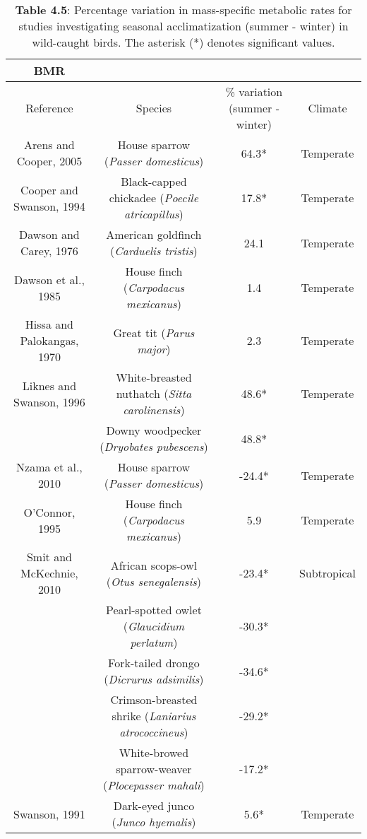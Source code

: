 \documentclass[10pt, twoside]{book} %
\begin{document}
\begin{table}[!ht]
    \centering
\caption*{\textbf{Table 4.5}: Percentage variation in mass-specific metabolic rates for studies investigating seasonal acclimatization (summer - winter) in wild-caught birds. The asterisk (*) denotes significant values.}
\begin{adjustbox}{max width=\textwidth}    
    \begin{tabular}{cccc}
    \hline
        BMR & ~ & ~ & ~ \\ \hline
        Reference & Species & \% variation (summer - winter) & Climate \\ 
        Arens and Cooper, 2005 & House sparrow (\textit{Passer domesticus}) & 64.3* & Temperate \\ 
        Cooper and Swanson, 1994 & Black-capped chickadee (\textit{Poecile atricapillus}) & 17.8* & Temperate \\ 
        Dawson and Carey, 1976 & American goldfinch (\textit{Carduelis tristis}) & 24.1 & Temperate \\ 
        Dawson et al., 1985 & House finch (\textit{Carpodacus mexicanus}) & 1.4 & Temperate \\ 
        Hissa and Palokangas, 1970 & Great tit (\textit{Parus major}) & 2.3 & Temperate \\ 
        Liknes and Swanson, 1996 & White-breasted nuthatch (\textit{Sitta carolinensis}) & 48.6* & Temperate \\ 
        ~ & Downy woodpecker (\textit{Dryobates pubescens}) & 48.8* & ~ \\ 
        Nzama et al., 2010 & House sparrow (\textit{Passer domesticus}) & -24.4* & Temperate \\ 
        O'Connor, 1995 & House finch (\textit{Carpodacus mexicanus}) & 5.9 & Temperate \\ 
        Smit and McKechnie, 2010 & African scops-owl (\textit{Otus senegalensis}) & -23.4* & Subtropical \\ 
        ~ & Pearl-spotted owlet (\textit{Glaucidium perlatum}) & -30.3* & ~ \\ 
        ~ & Fork-tailed drongo (\textit{Dicrurus adsimilis}) & -34.6* & ~ \\ 
        ~ & Crimson-breasted shrike (\textit{Laniarius atrococcineus}) & -29.2* & ~ \\ 
        ~ & White-browed sparrow-weaver (\textit{Plocepasser mahali}) & -17.2* & ~ \\ 
        Swanson, 1991 & Dark-eyed junco (\textit{Junco hyemalis}) & 5.6* & Temperate \\ 

\end{tabular}
\end{adjustbox}
\end{table}
\end{document}
